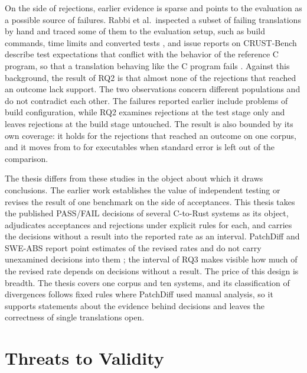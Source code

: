 On the side of rejections, earlier evidence is sparse and points to the evaluation as a possible source of failures. Rabbi et al.\ inspected a subset of failing translations by hand and traced some of them to the evaluation setup, such as build commands, time limits and converted tests \cite{rabbi2026beyond}, and issue reports on CRUST-Bench describe test expectations that conflict with the behavior of the reference C program, so that a translation behaving like the C program fails \cite{crustbench-issues}. Against this background, the result of RQ2 is that almost none of the rejections that reached an outcome lack support. The two observations concern different populations and do not contradict each other. The failures reported earlier include problems of build configuration, while RQ2 examines rejections at the test stage only and leaves rejections at the build stage untouched. The result is also bounded by its own coverage: it holds for the rejections that reached an outcome on one corpus, and it moves from  to  for executables when standard error is left out of the comparison.

The thesis differs from these studies in the object about which it draws conclusions. The earlier work establishes the value of independent testing or revises the result of one benchmark on the side of acceptances. This thesis takes the published PASS/FAIL decisions of several C-to-Rust systems as its object, adjudicates acceptances and rejections under explicit rules for each, and carries the decisions without a result into the reported rate as an interval. PatchDiff and SWE-ABS report point estimates of the revised rates and do not carry unexamined decisions into them \cite{wang2026patchdiff,yu2026sweabs}; the interval of RQ3 makes visible how much of the revised rate depends on decisions without a result. The price of this design is breadth. The thesis covers one corpus and ten systems, and its classification of divergences follows fixed rules where PatchDiff used manual analysis, so it supports statements about the evidence behind decisions and leaves the correctness of single translations open.

\section{Threats to Validity}\label{sec:d-threats}

